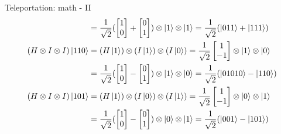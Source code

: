 \documentclass{beamer}
\begin{document}
\begin{frame}{Teleportation: math - II}
{\begin{align*}
                                        & =\frac{1}{\sqrt{2}} (\begin{bmatrix} 1 \\ 0 \end{bmatrix} + \begin{bmatrix} 0 \\ 1 \end{bmatrix}) \otimes \ket{1} \otimes \ket{1} 
      =\frac{1}{\sqrt{2}} (\ket{011} + \ket{111})
      \\
      (H \otimes I \otimes I) \ket{110} & = (H \ket{1}) \otimes (I \ket{1}) \otimes (I \ket{0})
      =\frac{1}{\sqrt{2}} \begin{bmatrix} 1 \\ -1 \end{bmatrix} \otimes \ket{1} \otimes \ket{0} \\
                                        & =\frac{1}{\sqrt{2}} (\begin{bmatrix} 1 \\ 0 \end{bmatrix} - \begin{bmatrix} 0 \\ 1 \end{bmatrix}) \otimes \ket{1} \otimes \ket{0} 
      =\frac{1}{\sqrt{2}} (\ket{01010} - \ket{110})
      \\
      (H \otimes I \otimes I) \ket{101} & = (H \ket{1}) \otimes (I \ket{0}) \otimes (I \ket{1})
      =\frac{1}{\sqrt{2}} \begin{bmatrix} 1 \\ -1 \end{bmatrix} \otimes \ket{0} \otimes \ket{1} \\
                                        & =\frac{1}{\sqrt{2}} (\begin{bmatrix} 1 \\ 0 \end{bmatrix} - \begin{bmatrix} 0 \\ 1 \end{bmatrix}) \otimes \ket{0} \otimes \ket{1} 
      =\frac{1}{\sqrt{2}} (\ket{001} - \ket{101})
      \\
    \end{align*}
  }%
\end{frame}
\end{document}
